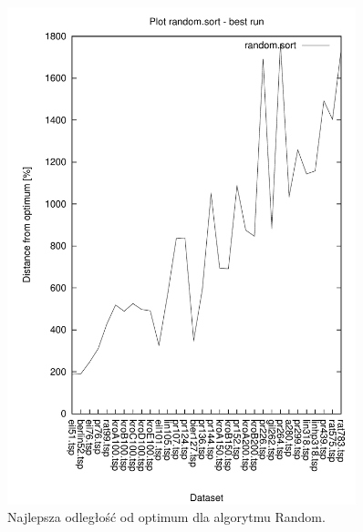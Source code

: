 \begin{figure}
\begin{center}
\includegraphics[width=0.9\textwidth]{wykresy/random_sort_best}
\end{center}
\caption{Najlepsza odległość od optimum dla algorytmu Random.}
\label{random_sort_best}
\end{figure}


